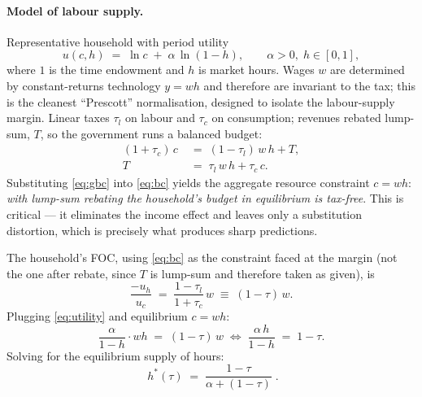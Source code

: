\documentclass[11pt,a4paper]{article}
\begin{document}
\paragraph{Model of labour supply.}
Representative household with period utility
\begin{equation}
u(c,h)\;=\;\ln c \;+\;\alpha\,\ln(1-h),\qquad \alpha>0,\; h\in[0,1],
\label{eq:utility}
\end{equation}
where $1$ is the time endowment and $h$ is market hours. Wages $w$ are determined by constant-returns technology $y=wh$ and therefore are invariant to the tax; this is the cleanest ``Prescott'' normalisation, designed to isolate the labour-supply margin. Linear taxes $\tau_l$ on labour and $\tau_c$ on consumption; revenues rebated lump-sum, $T$, so the government runs a balanced budget:
\begin{align}
(1+\tau_c)\,c \;&=\;(1-\tau_l)\,w\,h + T, \label{eq:bc}\\
T \;&=\;\tau_l\,w\,h + \tau_c\,c. \label{eq:gbc}
\end{align}
Substituting \eqref{eq:gbc} into \eqref{eq:bc} yields the aggregate resource constraint $c = wh$: \emph{with lump-sum rebating the household's budget in equilibrium is tax-free}. This is critical --- it eliminates the income effect and leaves only a substitution distortion, which is precisely what produces sharp predictions.

The household's FOC, using \eqref{eq:bc} as the constraint faced at the margin (not the one after rebate, since $T$ is lump-sum and therefore taken as given), is
\begin{equation}
\frac{-u_h}{u_c}\;=\;\frac{1-\tau_l}{1+\tau_c}\,w \;\equiv\; (1-\tau)\,w.
\label{eq:foc}
\end{equation}
Plugging \eqref{eq:utility} and equilibrium $c=wh$:
\begin{equation}
\frac{\alpha}{1-h}\cdot wh \;=\; (1-\tau)\,w \;\Longleftrightarrow\; \frac{\alpha\, h}{1-h}\;=\;1-\tau.
\label{eq:implicit}
\end{equation}
Solving for the equilibrium supply of hours:
\begin{equation}
\boxed{\;h^{*}(\tau)\;=\;\frac{1-\tau}{\alpha+(1-\tau)}\;.}
\label{eq:hours}
\end{equation}
\end{document}
